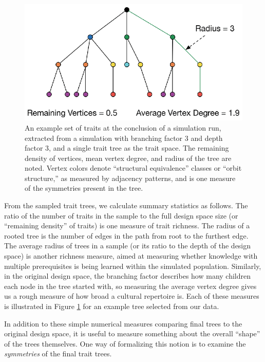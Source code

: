 \begin{figure}[htbp] 
\centering 
\includegraphics[]{graphics/semanticaxelrod/equil-trait-tree.eps} 
\caption{An example set of traits at the conclusion of a simulation run, extracted from a simulation with branching factor 3 and depth factor 3, and a single trait tree as the trait space.  The remaining density of vertices, mean vertex degree, and radius of the tree are noted.  Vertex colors denote ``structural equivalence'' classes or ``orbit structure,'' as measured by adjacency patterns, and is one measure of the symmetries present in the tree.} 
\label{semax:img:final-tree} 
\end{figure}

From the sampled trait trees, we calculate summary statistics as
follows. The ratio of the number of traits in the sample to the full
design space size (or ``remaining density'' of traits) is one measure of
trait richness. The radius of a rooted tree is the number of edges in
the path from root to the furthest edge. The average radius of trees in
a sample (or its ratio to the depth of the design space) is another
richness measure, aimed at measuring whether knowledge with multiple
prerequisites is being learned within the simulated population.
Similarly, in the original design space, the branching factor describes
how many children each node in the tree started with, so measuring the
average vertex degree gives us a rough measure of how broad a cultural
repertoire is. Each of these measures is illustrated in Figure
\ref{semax:img:final-tree} for an example tree selected from our data.

In addition to these simple numerical measures comparing final trees to
the original design space, it is useful to measure something about the
overall ``shape'' of the trees themselves. One way of formalizing this
notion is to examine the \emph{symmetries} of the final trait trees.

